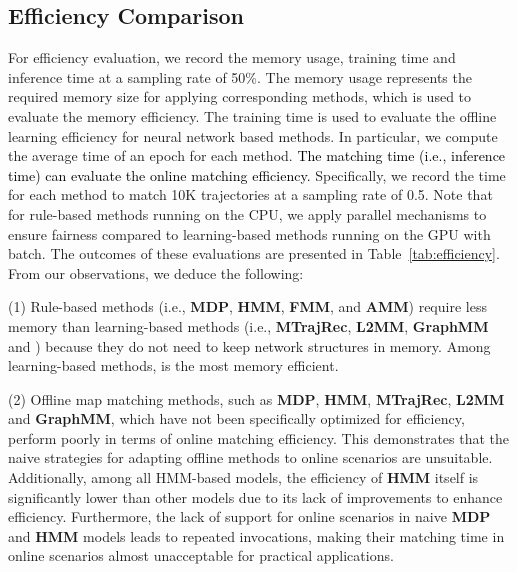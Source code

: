 
\subsection{Efficiency Comparison}


For efficiency evaluation, we record the memory usage, training time and inference time at a sampling rate of 50\%. The memory usage represents the required memory size for applying corresponding methods, which is used to evaluate the memory efficiency. The training time is used to evaluate the offline learning efficiency for neural network based methods. In particular, we compute the average time of an epoch for each method. \textcolor{black}{The matching time (i.e., inference time) can evaluate the online matching efficiency.} Specifically, we record the time for each method to match 10K trajectories at a sampling rate of 0.5. Note that for rule-based methods running on the CPU, we apply parallel mechanisms to ensure fairness compared to learning-based methods running on the GPU with batch.
The outcomes of these evaluations are presented in Table~\ref{tab:efficiency}. From our observations, we deduce the following:

\noindent (1) Rule-based methods (i.e., \textbf{MDP}, \textbf{HMM}, \textbf{FMM}, and \textbf{AMM}) require less memory than learning-based methods (i.e., \textbf{MTrajRec}, \textbf{L2MM}, \textbf{GraphMM} and \textbf{\modelName}) because they do not need to keep network structures in memory. Among learning-based methods, \textbf{\modelName} is the most memory efficient.

\noindent (2) Offline map matching methods, such as \textbf{MDP}, \textbf{HMM}, \textbf{MTrajRec}, \textbf{L2MM} and \textbf{GraphMM}, which have not been specifically optimized for efficiency, perform poorly in terms of online matching efficiency. This demonstrates that the naive strategies for adapting offline methods to online scenarios are unsuitable. Additionally, among all HMM-based models, the efficiency of \textbf{HMM} itself is significantly lower than other models due to its lack of improvements to enhance efficiency. Furthermore, the lack of support for online scenarios in naive \textbf{MDP} and \textbf{HMM} models leads to repeated invocations, making their matching time in online scenarios almost unacceptable for practical applications.

